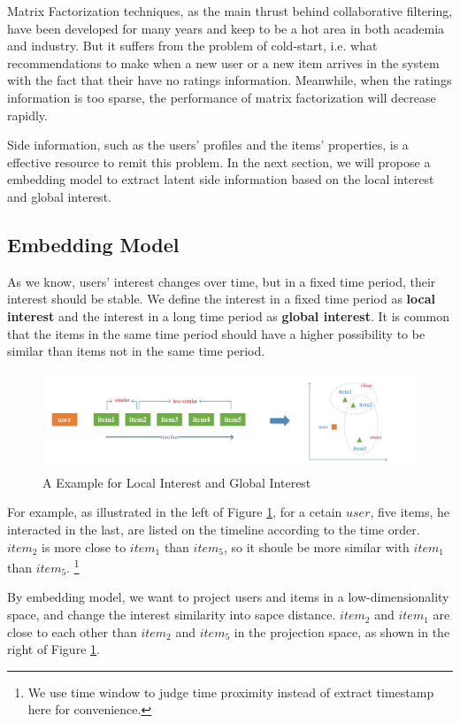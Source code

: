 \documentclass{sig-alternate-05-2015}
\begin{document}
Matrix Factorization techniques, as the main thrust behind collaborative filtering,
have been developed for many years and keep to be a hot area in both academia and industry.
But it suffers from the problem of cold-start,
i.e. what recommendations to make when a new user or a new item arrives in the system
with the fact that their have no ratings information.
Meanwhile, when the ratings information is too sparse,
the performance of matrix factorization will decrease rapidly.

Side information, such as the users' profiles and the items' properties,
is a effective resource to remit this problem.
In the next section, we will propose a embedding model
to extract latent side information based on the local interest and global interest.

\subsection{Embedding Model}
As we know, users' interest changes over time,
but in a fixed time period, their interest should be stable.
We define the interest in a fixed time period as \textbf{local interest}
and the interest in a long time period as \textbf{global interest}.
It is common that the items in the same time period
should have a higher possibility to be similar than
items not in the same time period.

\begin{figure}[htbp]
	\centering
	\includegraphics[scale=0.6]{images/1.pdf}
	\caption{A Example for Local Interest and Global Interest}
	\label{fig:example}
\end{figure}

For example, as illustrated in the left of Figure \ref{fig:example},
for a cetain $user$, five items, he interacted in the last,
are listed on the timeline according to the time order.
$item_2$ is more close to $item_1$ than $item_5$,
so it shoule be more similar with $item_1$ than $item_5$.
\footnote{We use time window to judge time proximity instead of extract timestamp here for convenience.}

By embedding model, we want to project users and items in a low-dimensionality space,
and change the interest similarity into sapce distance.
$item_2$ and $item_1$ are close to each other than $item_2$ and $item_5$
in the projection space, as shown in the right of Figure \ref{fig:example}.
\end{document}
